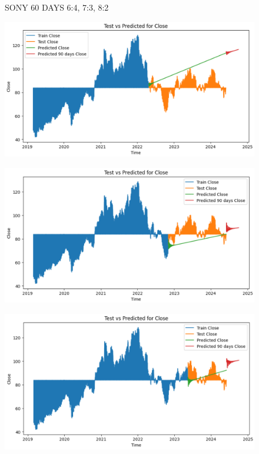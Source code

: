 \documentclass{article}
\begin{document}
\begin{multicols}{2}
\begin{figure}[H]
\begin{minipage}{0.15\textwidth}
    \label{fig:3}
    \end{minipage}
    \caption{SONY 60 DAYS  6:4, 7:3, 8:2 }
\end{figure}

\begin{figure}[H]
    \centering
    \begin{minipage}{0.15\textwidth}
    \centering
    \includegraphics[width=1\textwidth]{Image/VARMA/SONY/6_4/90.png}
   
    \label{fig:1}
    \end{minipage}%
    \begin{minipage}{0.15\textwidth}
    \centering
    \includegraphics[width=1\textwidth]{Image/VARMA/SONY/7_3/90.png}
  
    \label{fig:2}
    \end{minipage}%
    \begin{minipage}{0.15\textwidth}
    \centering
    \includegraphics[width=1\textwidth]{Image/VARMA/SONY/8_2/90.png}


\end{minipage}
\end{figure}
\end{multicols}
\end{document}
